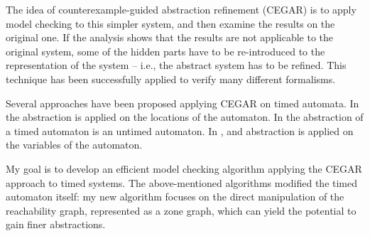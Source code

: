 The idea of counterexample-guided abstraction refinement (CEGAR) \cite{clarke2003counterexample} is to apply 
model checking to this simpler system, and then examine the results on the original one.
If the analysis shows that the results are not applicable to the original system, some of the hidden parts have to be re-introduced to the representation of the system -- i.e.,
the abstract system has to be refined. This technique has been successfully applied to verify many different
formalisms.

Several approaches have been proposed applying CEGAR on timed automata.  In \cite{kemper2007sat}
the abstraction is applied on the locations of the automaton. In
\cite{nagaoka2010abstraction} the abstraction of a timed automaton is an untimed
automaton. In \cite{dierks2007automatic, he2010compositional}, and
\cite{okano2011clock} abstraction is applied on the variables of the automaton.

My goal is to develop an efficient model checking algorithm applying the
CEGAR approach to timed systems. The above-mentioned algorithms modified the timed automaton itself: my new 
algorithm focuses on the direct manipulation of the reachability graph, represented as a zone graph, which can
yield the potential to gain finer abstractions.



